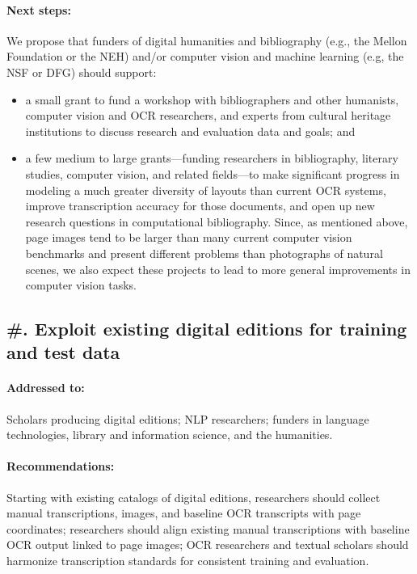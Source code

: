 \documentclass[twoside,11pt]{report}
\newcounter{reccounter}
\renewcommand{\thereccounter}{\arabic{reccounter}}
\newcommand{\recommend}[2]{\refstepcounter{reccounter}%
  \label{rec:#1}%
  \subsection{\#\thereccounter. #2}%
  \label{sec:rec-#1}}
\begin{document}
\paragraph{Next steps:} We propose that funders of digital humanities and bibliography (e.g., the Mellon Foundation or the NEH) and/or computer vision and machine learning (e.g, the NSF or DFG) should support:
\begin{itemize}

\item a small grant to fund a workshop with bibliographers and other humanists, computer vision and OCR researchers, and experts from cultural heritage institutions to discuss research and evaluation data and goals; and

\item a few medium to large grants---funding researchers in bibliography, literary studies, computer vision, and related fields---to make significant progress in modeling a much greater diversity of layouts than current OCR systems, improve transcription accuracy for those documents, and open up new research questions in computational bibliography. Since, as mentioned above, page images tend to be larger than many current computer vision benchmarks and present different problems than photographs of natural scenes, we also expect these projects to lead to more general improvements in computer vision tasks.

\end{itemize}

\recommend{editions}{Exploit existing digital editions for training and test data}

\paragraph{Addressed to:} Scholars producing digital editions; NLP researchers; funders in language technologies, library and information science, and the humanities.

\paragraph{Recommendations:} Starting with existing catalogs of digital editions, researchers should collect manual transcriptions, images, and baseline OCR transcripts with page coordinates; researchers should align existing manual transcriptions with baseline OCR output linked to page images; OCR researchers and textual scholars should harmonize transcription standards for consistent training and evaluation.
\end{document}
